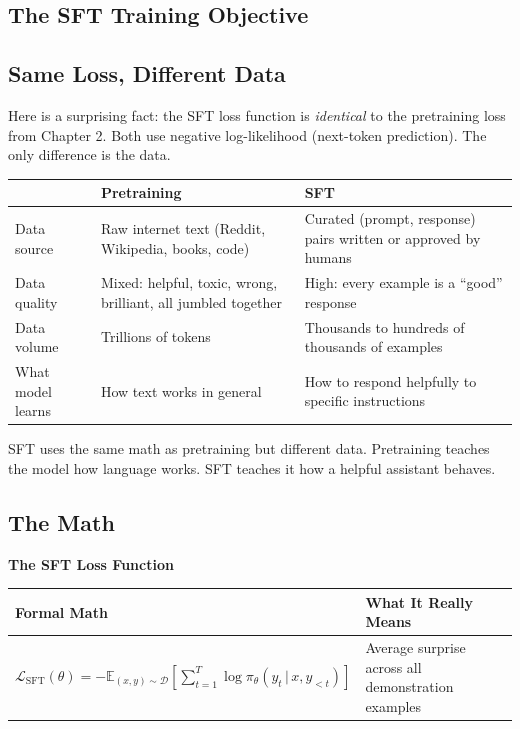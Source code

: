 \begin{chapterenv}
\section{The SFT Training Objective}

\subsection{Same Loss, Different Data}

Here is a surprising fact: the SFT loss function is \textit{identical} to the pretraining loss from Chapter 2. Both use negative log-likelihood (next-token prediction). The only difference is the data.

\begin{center}
\begin{tabular}{p{}p{}p{}}
\toprule
& \textbf{Pretraining} & \textbf{SFT} \\
\midrule
Data source & Raw internet text (Reddit, Wikipedia, books, code) & Curated (prompt, response) pairs written or approved by humans \\
Data quality & Mixed: helpful, toxic, wrong, brilliant, all jumbled together & High: every example is a ``good'' response \\
Data volume & Trillions of tokens & Thousands to hundreds of thousands of examples \\
What model learns & How text works in general & How to respond helpfully to specific instructions \\
\bottomrule
\end{tabular}
\end{center}

\begin{tipbox}
SFT uses the same math as pretraining but different data. Pretraining teaches the model how language works. SFT teaches it how a helpful assistant behaves.
\end{tipbox}

\subsection{The Math}

\begin{infobox}
\textbf{The SFT Loss Function}

\begin{center}
\begin{tabular}{p{}p{}}
\toprule
\textbf{Formal Math} & \textbf{What It Really Means} \\
\midrule
$\mathcal{L}_{\text{SFT}}(\theta) = -\mathbb{E}_{(x,y) \sim \mathcal{D}}\!\left[\sum_{t=1}^T \log \pi_\theta(y_t \,|\, x, y_{<t})\right]$ & Average surprise across all demonstration examples \\
\bottomrule
\end{tabular}
\end{center}


\end{infobox}
\end{chapterenv}

